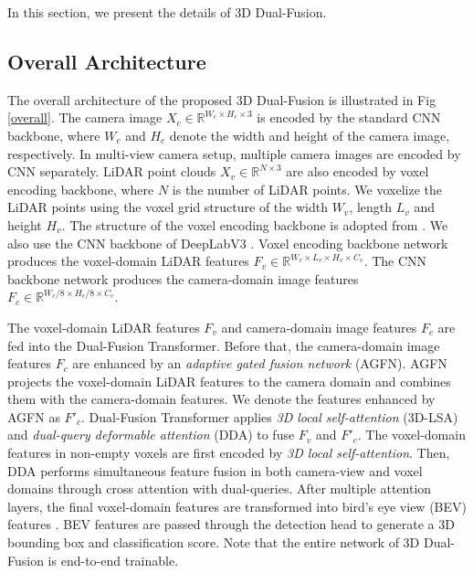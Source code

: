 \documentclass[lettersize,journal]{IEEEtran}
\begin{document}
In this section, we present the details of 3D Dual-Fusion. 

\subsection{Overall Architecture}
The overall architecture of the proposed 3D Dual-Fusion is illustrated in Fig \ref{overall}. The camera image $X_{c}\in\mathbb{R}^{{W_{c}}{\times}{H_{c}}{\times}3}$ is encoded by the standard CNN backbone, where $W_{c}$ and $H_{c}$ denote the width and height of the camera image, respectively. In multi-view camera setup, multiple camera images are encoded by CNN separately. LiDAR point clouds $X_{v}\in\mathbb{R}^{N{\times}3}$ are also encoded by voxel encoding backbone, where $N$ is the number of LiDAR points. We voxelize the LiDAR points using the voxel grid structure of the width $W_{v}$, length $L_{v}$ and height $H_{v}$.  The structure of the voxel encoding backbone is adopted from  \cite{second}. We also use the CNN backbone of  DeepLabV3 \cite{deeplabv3}. Voxel encoding backbone network produces the voxel-domain LiDAR features $F_{v}\in\mathbb{R}^{{W_{v}}{\times}{L_{v}}{\times}{H_{v}}{\times}{C_{v}}}$. The CNN backbone network produces the camera-domain image features $F_c\in\mathbb{R}^{{W_{c}}/8{\times}{H_{c}}/8{\times}{C_{c}}}$.



The voxel-domain LiDAR features $F_{v}$ and camera-domain image features $F_{c}$ are fed into the Dual-Fusion Transformer. Before that, the camera-domain image features $F_{c}$ are enhanced by an {\it adaptive gated fusion network} (AGFN). AGFN projects the voxel-domain LiDAR features to the camera domain and combines them with the camera-domain features. We denote the features enhanced by AGFN as $F'_{c}$.
Dual-Fusion Transformer applies {\it 3D local self-attention} (3D-LSA) and {\it dual-query deformable attention} (DDA) to fuse  $F_{v}$ and $F'_{c}$. The voxel-domain features in non-empty voxels are first encoded by {\it 3D local self-attention}. Then, DDA performs simultaneous feature fusion in both camera-view and voxel domains through cross attention with dual-queries.  After multiple attention layers, the final voxel-domain features are transformed into bird's eye view (BEV) features \cite{second}.  BEV features are passed through the detection head to generate a 3D bounding box and classification score.
Note that the entire network of 3D Dual-Fusion is end-to-end trainable.
\end{document}
